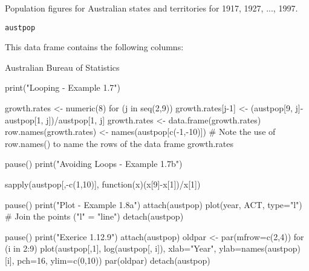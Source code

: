 \begin{Description}\relax
Population figures for Australian states and territories for 1917, 1927,
..., 1997.
\end{Description}
\begin{Usage}
\begin{verbatim}austpop\end{verbatim}
\end{Usage}
\begin{Format}\relax
This data frame contains the following columns:
\end{Format}
\begin{Source}\relax
Australian Bureau of Statistics
\end{Source}
\begin{Examples}
\begin{ExampleCode}
print("Looping - Example 1.7")

growth.rates <- numeric(8)
for (j in seq(2,9)) {
    growth.rates[j-1] <- (austpop[9, j]-austpop[1, j])/austpop[1, j] }
growth.rates <- data.frame(growth.rates)
row.names(growth.rates) <- names(austpop[c(-1,-10)])
  # Note the use of row.names() to name the rows of the data frame
growth.rates

pause()
print("Avoiding Loops - Example 1.7b")

sapply(austpop[,-c(1,10)], function(x){(x[9]-x[1])/x[1]})

pause()
print("Plot - Example 1.8a")
attach(austpop)
plot(year, ACT, type="l") # Join the points ("l" = "line")
detach(austpop)

pause()
print("Exerice 1.12.9")
attach(austpop)
oldpar <- par(mfrow=c(2,4))  
for (i in 2:9){
plot(austpop[,1], log(austpop[, i]), xlab="Year",
    ylab=names(austpop)[i], pch=16, ylim=c(0,10))}
par(oldpar) 
detach(austpop)

\end{ExampleCode}
\end{Examples}

